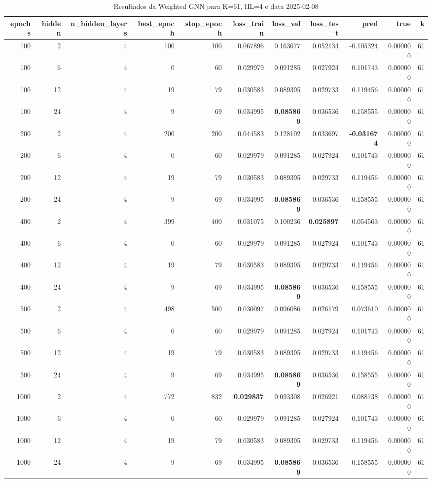 \begin{table}
\caption{Resultados da Weighted GNN para K=61, HL=4 e data 2025-02-08}
\label{tab:weighted_gnn_results_k61_hl4_d20250208}
\begin{tabular}{rrrrrrrrrrr}
\toprule
epochs & hidden & n\_hidden\_layers & best\_epoch & stop\_epoch & loss\_train & loss\_val & loss\_test & pred & true & k \\
\midrule
100 & 2 & 4 & 100 & 100 & 0.067896 & 0.163677 & 0.052134 & -0.105324 & 0.000000 & 61 \\
100 & 6 & 4 & 0 & 60 & 0.029979 & 0.091285 & 0.027924 & 0.101743 & 0.000000 & 61 \\
100 & 12 & 4 & 19 & 79 & 0.030583 & 0.089395 & 0.029733 & 0.119456 & 0.000000 & 61 \\
100 & 24 & 4 & 9 & 69 & 0.034995 & \textbf{0.085869} & 0.036536 & 0.158555 & 0.000000 & 61 \\
200 & 2 & 4 & 200 & 200 & 0.044583 & 0.128102 & 0.033697 & \textbf{-0.031674} & 0.000000 & 61 \\
200 & 6 & 4 & 0 & 60 & 0.029979 & 0.091285 & 0.027924 & 0.101743 & 0.000000 & 61 \\
200 & 12 & 4 & 19 & 79 & 0.030583 & 0.089395 & 0.029733 & 0.119456 & 0.000000 & 61 \\
200 & 24 & 4 & 9 & 69 & 0.034995 & \textbf{0.085869} & 0.036536 & 0.158555 & 0.000000 & 61 \\
400 & 2 & 4 & 399 & 400 & 0.031075 & 0.100236 & \textbf{0.025897} & 0.054563 & 0.000000 & 61 \\
400 & 6 & 4 & 0 & 60 & 0.029979 & 0.091285 & 0.027924 & 0.101743 & 0.000000 & 61 \\
400 & 12 & 4 & 19 & 79 & 0.030583 & 0.089395 & 0.029733 & 0.119456 & 0.000000 & 61 \\
400 & 24 & 4 & 9 & 69 & 0.034995 & \textbf{0.085869} & 0.036536 & 0.158555 & 0.000000 & 61 \\
500 & 2 & 4 & 498 & 500 & 0.030097 & 0.096086 & 0.026179 & 0.073610 & 0.000000 & 61 \\
500 & 6 & 4 & 0 & 60 & 0.029979 & 0.091285 & 0.027924 & 0.101743 & 0.000000 & 61 \\
500 & 12 & 4 & 19 & 79 & 0.030583 & 0.089395 & 0.029733 & 0.119456 & 0.000000 & 61 \\
500 & 24 & 4 & 9 & 69 & 0.034995 & \textbf{0.085869} & 0.036536 & 0.158555 & 0.000000 & 61 \\
1000 & 2 & 4 & 772 & 832 & \textbf{0.029837} & 0.093308 & 0.026921 & 0.088738 & 0.000000 & 61 \\
1000 & 6 & 4 & 0 & 60 & 0.029979 & 0.091285 & 0.027924 & 0.101743 & 0.000000 & 61 \\
1000 & 12 & 4 & 19 & 79 & 0.030583 & 0.089395 & 0.029733 & 0.119456 & 0.000000 & 61 \\
1000 & 24 & 4 & 9 & 69 & 0.034995 & \textbf{0.085869} & 0.036536 & 0.158555 & 0.000000 & 61 \\
\bottomrule
\end{tabular}
\end{table}

